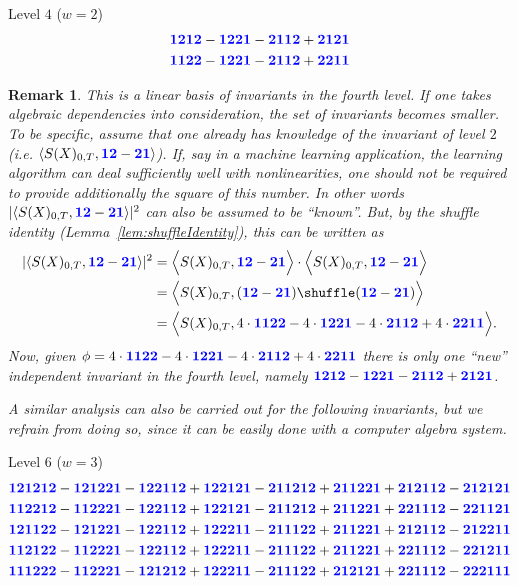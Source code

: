 \documentclass{scrartcl}
\theoremstyle{plain}
\newtheorem{remark}[theorem]{Remark}
\theoremstyle{definition}
\newcommand{\1}[1]{1_{\{#1\}}}
\def\word#1{{\color{blue}\mathbf{#1}}}
\begin{document}
Level $4$ ($w=2$)
\begin{align*}
  & \word{1212} - \word{1221} - \word{2112} + \word{2121} \\
  & \word{1122} - \word{1221} - \word{2112} + \word{2211}
\end{align*}
\begin{remark}
  \label{rem:algebraicIndependence}
  This is a \textit{linear} basis of invariants in the fourth level.
  If one takes \textit{algebraic} dependencies into consideration,
  the set of invariants becomes smaller.
  To be specific,
  assume that one already has knowledge
  of the invariant of level $2$
  (i.e. $\langle S(X)_{0,T}, \word{12} - \word{21} \rangle$).
  If, say in a machine learning application,
  the learning algorithm can deal sufficiently well
  with nonlinearities, one should not be required to
  provide additionally the square of this number.
  In other words $|\langle S(X)_{0,T}, \word{12} - \word{21} \rangle|^2$ can also be assumed to be ``known''.
  But, by the shuffle identity (Lemma~\ref{lem:shuffleIdentity}),
  this can be written as
  \begin{align*}
    |\langle S(X)_{0,T}, \word{12} - \word{21} \rangle|^2&=\Big\langle S(X)_{0,T}, \word{12} - \word{21} \Big\rangle \cdot
    \Big\langle S(X)_{0,T}, \word{12} - \word{21} \Big\rangle
    \\&=
    \Big\langle S(X)_{0,T}, (\word{12} - \word{21}) \shuffle (\word{12} - \word{21}) \Big\rangle \\
    &=
    \Big\langle S(X)_{0,T}, 4\cdot \word{1122} - 4\cdot \word{1221} - 4\cdot \word{2112} + 4\cdot \word{2211} \Big\rangle.
  \end{align*}
  Now, given $\phi = 4\cdot \word{1122} - 4\cdot \word{1221} - 4\cdot \word{2112} + 4\cdot \word{2211}$ there is only one ``new'' independent invariant in the fourth level,
  namely $\word{1212} - \word{1221} - \word{2112} + \word{2121}$.

  A similar analysis can also be carried out for the following invariants, but we refrain from doing so, since
  it can be easily done with a computer algebra system.
\end{remark}

Level $6$ ($w=3$)
\begin{align*}
  & \word{121212} - \word{121221} - \word{122112} + \word{122121} - \word{211212} + \word{211221} + \word{212112} - \word{212121} \\
  & \word{112212} - \word{112221} - \word{122112} + \word{122121} - \word{211212} + \word{211221} + \word{221112} - \word{221121} \\
  & \word{121122} - \word{121221} - \word{122112} + \word{122211} - \word{211122} + \word{211221} + \word{212112} - \word{212211} \\
  & \word{112122} - \word{112221} - \word{122112} + \word{122211} - \word{211122} + \word{211221} + \word{221112} - \word{221211} \\
  & \word{111222} - \word{112221} - \word{121212} + \word{122211} - \word{211122} + \word{212121} + \word{221112} - \word{222111}
\end{align*}
\end{document}
